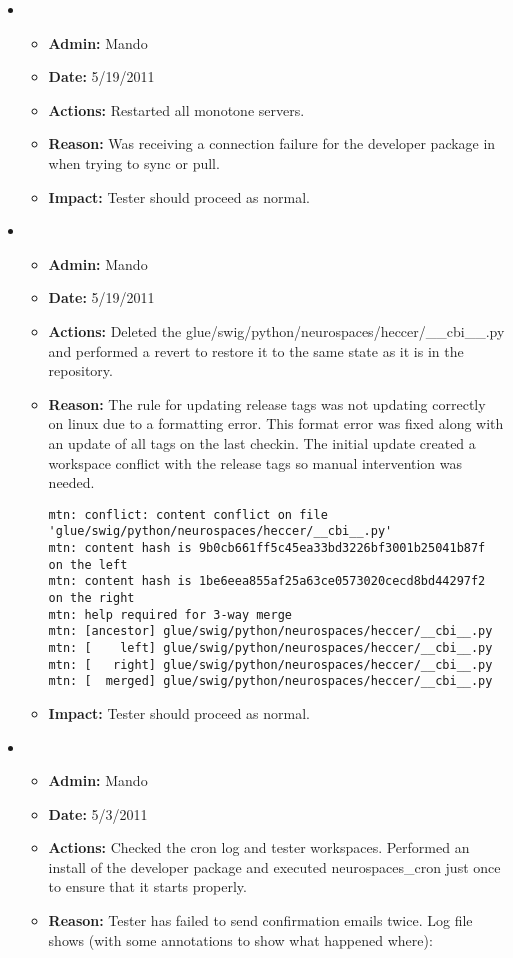 \documentclass[12pt]{article}
\begin{document}
\begin{itemize}
  
\item
  \begin{itemize}
  \item[] {\bf Admin:} Mando
  \item[] {\bf Date:} 5/19/2011
  \item[] {\bf Actions:} Restarted all monotone servers.
  \item[] {\bf Reason:} Was receiving a connection failure for the
    developer package in when trying to sync or pull.
  \item[] {\bf Impact:} Tester should proceed as normal.
  \end{itemize}
  
  
\item
  \begin{itemize}
  \item[] {\bf Admin:} Mando
  \item[] {\bf Date:} 5/19/2011
  \item[] {\bf Actions:} Deleted the
    glue/swig/python/neurospaces/heccer/\_\_cbi\_\_.py and performed a
    revert to restore it to the same state as it is in the repository.
  \item[] {\bf Reason:} The rule for updating release tags was not
    updating correctly on linux due to a formatting error. This format
    error was fixed along with an update of all tags on the last
    checkin.  The initial update created a workspace conflict with the
    release tags so manual intervention was needed.
  
  \begin{verbatim}
mtn: conflict: content conflict on file 'glue/swig/python/neurospaces/heccer/__cbi__.py'
mtn: content hash is 9b0cb661ff5c45ea33bd3226bf3001b25041b87f on the left
mtn: content hash is 1be6eea855af25a63ce0573020cecd8bd44297f2 on the right
mtn: help required for 3-way merge
mtn: [ancestor] glue/swig/python/neurospaces/heccer/__cbi__.py
mtn: [    left] glue/swig/python/neurospaces/heccer/__cbi__.py
mtn: [   right] glue/swig/python/neurospaces/heccer/__cbi__.py
mtn: [  merged] glue/swig/python/neurospaces/heccer/__cbi__.py
  \end{verbatim}
  
  \item[] {\bf Impact:} Tester should proceed as normal. 
  \end{itemize}

\item
  \begin{itemize}
  \item[] {\bf Admin:} Mando
  \item[] {\bf Date:} 5/3/2011 
  \item[] {\bf Actions:} Checked the cron log and tester workspaces. Performed an install of the developer package and executed neurospaces\_cron just once to ensure that it starts properly.
  \item[] {\bf Reason:} Tester has failed to send confirmation emails twice. Log file shows (with some annotations to show what happened where):
  

\end{itemize}
\end{itemize}
\end{document}
